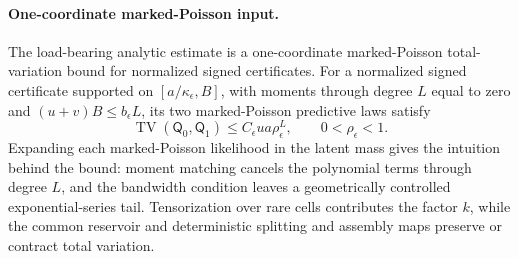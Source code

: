 \paragraph{One-coordinate marked-Poisson input.}
The load-bearing analytic estimate is a one-coordinate marked-Poisson total-variation bound for normalized signed certificates. For a normalized signed certificate supported on \([a/\kappa_\epsilon,B]\), with moments through degree \(L\) equal to zero and \((u+v)B\le b_\epsilon L\), its two marked-Poisson predictive laws satisfy
\[
\operatorname{TV}(\mathsf Q_0,\mathsf Q_1)
\le C_\epsilon u a\rho_\epsilon^L,
\qquad 0<\rho_\epsilon<1.
\]
Expanding each marked-Poisson likelihood in the latent mass gives the intuition behind the bound: moment matching cancels the polynomial terms through degree \(L\), and the bandwidth condition leaves a geometrically controlled exponential-series tail. Tensorization over rare cells contributes the factor \(k\), while the common reservoir and deterministic splitting and assembly maps preserve or contract total variation.
